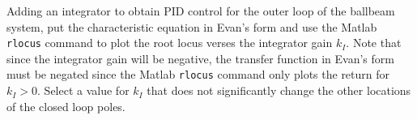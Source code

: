 Adding an integrator to obtain PID control for the outer loop of the ballbeam system, put the characteristic equation in Evan's form and use the Matlab {\tt rlocus} command to plot the root locus verses the integrator gain $k_I$.  Note that since the integrator gain will be negative, the transfer function in Evan's form must be negated since the Matlab \texttt{rlocus} command only plots the return for $k_I>0$.  Select a value for $k_I$ that does not significantly change the other locations of the closed loop poles.    
